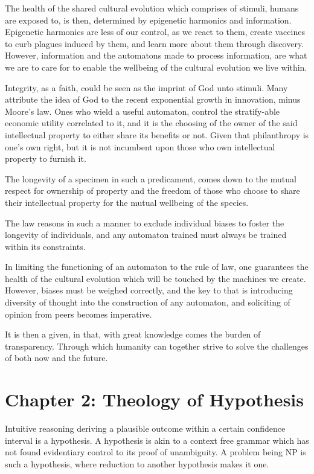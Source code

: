 \documentclass[ebook,12pt,oneside,openany]{memoir}
\begin{document}
\indent The health of the shared cultural evolution which comprises of stimuli, humans are exposed to, is then, determined by epigenetic harmonics and information. Epigenetic harmonics are less of our control, as we react to them, create vaccines to curb plagues induced by them, and learn more about them through discovery. However, information and the automatons made to process information, are what we are to care for to enable the wellbeing of the cultural evolution we live within.

\indent Integrity, as a faith, could be seen as the imprint of God unto stimuli. Many attribute the idea of God to the recent exponential growth in innovation, minus Moore’s law. Ones who wield a useful automaton, control the stratify-able economic utility correlated to it, and it is the choosing of the owner of the said intellectual property to either share its benefits or not. Given that philanthropy is one's own right, but it is not incumbent upon those who own intellectual property to furnish it.

\indent The longevity of a specimen in such a predicament, comes down to the mutual respect for ownership of property and the freedom of those who choose to share their intellectual property for the mutual wellbeing of the species.

\indent 	The law reasons in such a manner to exclude individual biases to foster the longevity of individuals, and any automaton trained must always be trained within its constraints.

\indent 	In limiting the functioning of an automaton to the rule of law, one guarantees the health of the cultural evolution which will be touched by the machines we create. However, biases must be weighed correctly, and the key to that is introducing diversity of thought into the construction of any automaton, and soliciting of opinion from peers becomes imperative.

\indent 	It is then a given, in that, with great knowledge comes the burden of transparency. Through which humanity can together strive to solve the challenges of both now and the future.
\chapter*{Chapter 2: Theology of Hypothesis}


\indent \indent Intuitive reasoning deriving a plausible outcome within a certain confidence interval is a hypothesis. A hypothesis is akin to a context free grammar which has not found evidentiary control to its proof of unambiguity. A problem being NP is such a hypothesis, where reduction to another hypothesis makes it one.
\end{document}

